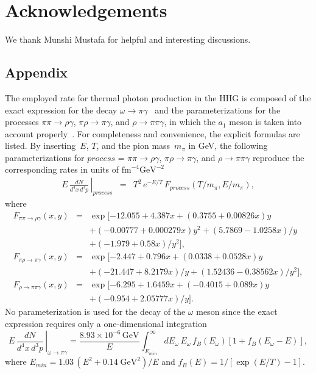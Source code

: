 \documentclass[12pt,twoside,fleqn]{article}
\newcommand{\be}{\begin{equation}}
\newcommand{\ee}{\end{equation}}
\newcommand{\bea}{\begin{eqnarray}}
\newcommand{\eea}{\end{eqnarray}}
\newcommand{\fm}{\mbox{fm}}
\newcommand{\GeV}{\mbox{GeV}}
\begin{document}
\section*{Acknowledgements}
\label{Acknowledgements}
%
We thank Munshi Mustafa for helpful and interesting discussions.
%
\begin{appendix}
\section*{Appendix}
\label{Appendix}
%
The employed rate for thermal photon production in the HHG is composed of the
exact expression for the decay $\omega \rightarrow \pi
\gamma$~\cite{KAPUSTA_1991} and the parameterizations for the processes $\pi \pi
\rightarrow \rho \gamma$, $\pi \rho \rightarrow \pi \gamma$, and $\rho
\rightarrow \pi \pi \gamma$, in which the $a_1$ meson is taken into account
properly~\cite{SONG_1993,SONG_1998}. For completeness and convenience, the
explicit formulas are listed. By inserting~$E$, $T$, and the pion mass~$m_{\pi}$
in GeV, the following parameterizations for $process$ = $\pi \pi \rightarrow
\rho \gamma$, $\pi \rho \rightarrow \pi \gamma$, and $\rho \rightarrow \pi \pi
\gamma$ reproduce the corresponding rates in units of
$\fm^{-4}\GeV^{-2}$~\cite{SONG_1998}
%
\bea
        \left. E\,\frac{dN}{d^4x\,d^3p} \,\right|_{process} & = & 
        T^2\,e^{-E/T}\,F_{process}(T/m_{\pi},E/m_{\pi}),
\eea
%
where
%
\bea
        F_{\pi\pi \rightarrow \rho\gamma}(x,y) 
        & = & \exp[-12.055 + 4.387x +(0.3755+0.00826x)y  
\nonumber\\      &   & + (-0.00777+0.000279x)y^2 + (5.7869-1.0258x)/y 
\nonumber\\      &   & + (-1.979+0.58x)/y^2],
\\
        F_{\pi\rho \rightarrow \pi\gamma}(x,y) 
        & = & \exp[-2.447 + 0.796x + (0.0338+0.0528x)y  
\nonumber\\      &   & + (-21.447+8.2179x)/y + (1.52436-0.38562x)/y^2],
\\
        F_{\rho \rightarrow \pi\pi\gamma}(x,y) 
        & = & \exp[-6.295 + 1.6459x + (-0.4015+0.089x)y  
\nonumber\\      &   & + (-0.954+2.05777x)/y].
\eea
%
No parameterization is used for the decay of the $\omega$ meson since the exact
expression requires only a one-dimensional integration~\cite{KAPUSTA_1991}
%
\be
        \left. E\,\frac{dN}{d^4x\,d^3p} \,\right|_{\omega \rightarrow \pi\gamma}
        \!\!\!\! = \frac{8.93\!\times\!10^{-6}\,\GeV}{E}
        \!\int^{\infty}_{E_{min}}\!\!\!dE_{\omega} 
        \, E_{\omega} \, f_{B}(E_{\omega})\left[1 + f_{B}(E_{\omega}-E)\right],
\label{omega->pigammaKAPUSTA}
\ee
%
where $E_{min} = 1.03\,(E^2 + 0.14\;\GeV^2)/E$ and $f_{B}(E) = 1/[\exp(E/T) - 1]$.
%
\end{appendix}
\end{document}
